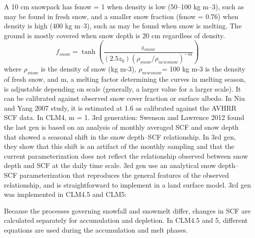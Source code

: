 \documentclass{article}
\begin{document}
A 10 cm snowpack has fsnow = 1 when density is low (50–100 kg m–3), such as may be found in fresh snow, and a smaller snow fraction (fsnow = 0.76) when density is high (400 kg m–3), such as may be found when snow is melting. The ground is mostly covered when snow depth is 20 cm regardless of density.
\begin{equation}
f_{snow} = \tanh( \frac{z_{snow}}{(2.5 z_0  ) (\rho_{snow}/\rho_{newsnow} )^{-m}} )
\end{equation}
where $\rho_{snow}$ is the density of snow (kg m-3), $\rho_{newsnow}$= 100 kg m-3 is the density of fresh snow, and m, a melting factor determining the curves in melting season, is adjustable depending on scale (generally, a larger value for a larger scale). It can be calibrated against observed snow cover fraction or surface albedo. In Niu and Yang 2007 study, it is estimated at 1.6 as calibrated against the AVHRR SCF data. In CLM4,  m = 1.
3rd generation: Swenson and Lawrence 2012 found the last gen is based on an analysis of monthly averaged SCF and snow depth that showed a seasonal shift in the snow depth–SCF relationship. In 3rd gen, they show that this shift is an artifact of the monthly sampling and that the current parameterization does not reflect the relationship observed between snow depth and SCF at the daily time scale. 
3rd gen use an analytical snow depth–SCF parameterization that reproduces the general features of the observed relationship, and is straightforward to implement in a land surface model. 
3rd gen was implemented in CLM4.5 and CLM5:

Because the processes governing snowfall and snowmelt differ, changes in SCF are calculated separately for accumulation and depletion. In CLM4.5 and 5, different equations are used during the accumulation and melt phases. 
\end{document}
